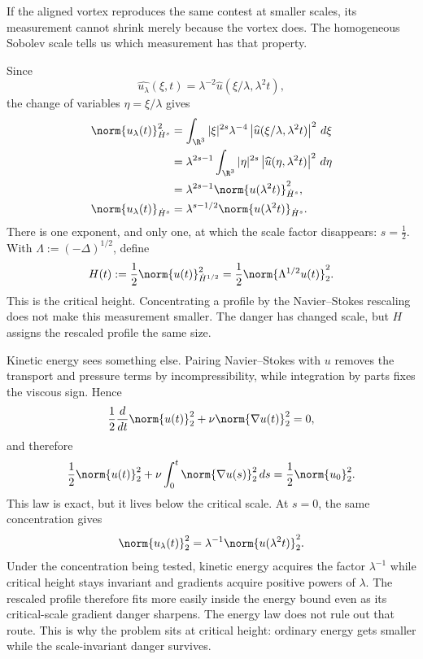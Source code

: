 If the aligned vortex reproduces the same contest at smaller scales, its measurement cannot shrink merely because the vortex does.  The homogeneous Sobolev scale tells us which measurement has that property.

Since
\[
  \widehat{u_\lambda}(\xi,t)
  =\lambda^{-2}\widehat u(\xi/\lambda,\lambda^2t),
\]
the change of variables \(\eta=\xi/\lambda\) gives
\begin{align*}
  \norm{u_\lambda(t)}_{\dot H^s}^2
  &=\int_{\R^3}
  |\xi|^{2s}\lambda^{-4}
  \left|\widehat u(\xi/\lambda,\lambda^2t)\right|^2
  \,d\xi
  \\
  &=\lambda^{2s-1}\int_{\R^3}
  |\eta|^{2s}
  \left|\widehat u(\eta,\lambda^2t)\right|^2
  \,d\eta
  \\
  &=\lambda^{2s-1}\norm{u(\lambda^2t)}_{\dot H^s}^2,
  \\
  \norm{u_\lambda(t)}_{\dot H^s}
  &=\lambda^{s-1/2}\norm{u(\lambda^2t)}_{\dot H^s}.
\end{align*}
There is one exponent, and only one, at which the scale factor disappears: \(s=\tfrac12\).  With \(\Lambda:=(-\Delta)^{1/2}\), define
\begin{equation}\label{eq:BodyCriticalHeightDefinition}
  H(t)
  :=\frac12\norm{u(t)}_{\dot H^{1/2}}^2
  =\frac12\norm{\Lambda^{1/2}u(t)}_2^2.
\end{equation}
This is the critical height.  Concentrating a profile by the Navier--Stokes rescaling does not make this measurement smaller.  The danger has changed scale, but \(H\) assigns the rescaled profile the same size.

Kinetic energy sees something else.  Pairing Navier--Stokes with \(u\) removes the transport and pressure terms by incompressibility, while integration by parts fixes the viscous sign.  Hence
\[
  \frac12\frac{d}{dt}\norm{u(t)}_2^2
  +\nu\norm{\nabla u(t)}_2^2
  =0,
\]
and therefore
\begin{equation}\label{eq:BodyEnergyIdentity}
  \frac12\norm{u(t)}_2^2
  +\nu\int_0^t\norm{\nabla u(s)}_2^2\,ds
  =\frac12\norm{u_0}_2^2.
\end{equation}
This law is exact, but it lives below the critical scale.  At \(s=0\), the same concentration gives
\[
  \norm{u_\lambda(t)}_2^2
  =\lambda^{-1}\norm{u(\lambda^2t)}_2^2.
\]
Under the concentration being tested, kinetic energy acquires the factor \(\lambda^{-1}\) while critical height stays invariant and gradients acquire positive powers of \(\lambda\).  The rescaled profile therefore fits more easily inside the energy bound even as its critical-scale gradient danger sharpens.  The energy law does not rule out that route.  This is why the problem sits at critical height: ordinary energy gets smaller while the scale-invariant danger survives.

